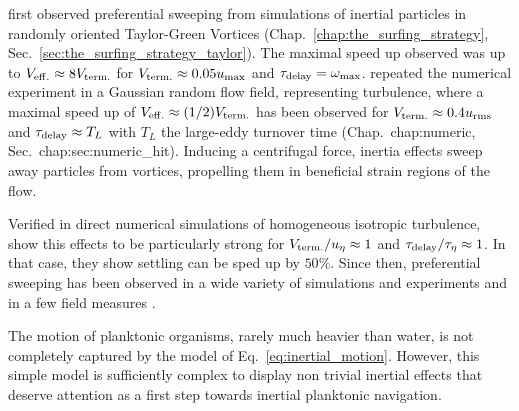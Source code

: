\citet{maxey1986gravitational} first observed preferential sweeping from simulations of inertial particles in randomly oriented Taylor-Green Vortices (Chap.~\ref{chap:the_surfing_strategy}, Sec.~\ref{sec:the_surfing_strategy_taylor}).
The maximal speed up observed was up to $V_{\mathrm{eff.}} \approx 8 V_{\mathrm{term.}}$ for $V_{\mathrm{term.}} \approx 0.05 u_{\mathrm{max}}$ and $\tau_{\mathrm{delay}} = \omega_{\mathrm{max}}$.
\citet{maxey1987gravitational} repeated the numerical experiment in a Gaussian random flow field, representing turbulence, where a maximal speed up of $V_{\mathrm{eff.}} \approx (1/2) V_{\mathrm{term.}}$ has been observed for $V_{\mathrm{term.}} \approx 0.4 u_{\mathrm{rms}}$ and $\tau_{\mathrm{delay}} \approx T_{L}$ with $T_{L}$ the large-eddy turnover time (Chap.~{chap:numeric}, Sec.~{chap:sec:numeric_hit}).
Inducing a centrifugal force, inertia effects sweep away particles from vortices, propelling them in beneficial strain regions of the flow.

Verified in direct numerical simulations of homogeneous isotropic turbulence, \citet{wang1993settling} show this effects to be particularly strong for $V_{\mathrm{term.}} / u_{\eta} \approx 1$ and $\tau_{\mathrm{delay}} / \tau_{\eta} \approx 1$.
In that case, they show settling can be sped up by $50\%$.
Since then, preferential sweeping has been observed in a wide variety of simulations \citep{ireland2016effect, tom2019multiscale, bragg2021mechanisms} and experiments \citep{sumbekova2017preferential, petersen2019experimental} and in a few field measures \citep{li2021evidence}.

The motion of planktonic organisms, rarely much heavier than water, is not completely captured by the model of Eq.~\eqref{eq:inertial_motion}.
However, this simple model is sufficiently complex to display non trivial inertial effects that deserve attention as a first step towards inertial planktonic navigation.

